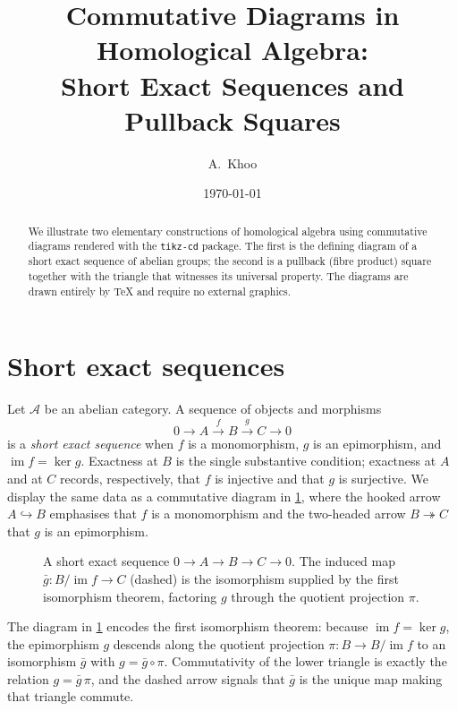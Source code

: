 \documentclass[11pt]{article}
\title{Commutative Diagrams in Homological Algebra:\\ Short Exact Sequences and Pullback Squares}
\author{A.\ Khoo}
\date{\today}
\begin{document}
\maketitle

\begin{abstract}
We illustrate two elementary constructions of homological algebra using
commutative diagrams rendered with the \texttt{tikz-cd} package. The first is the
defining diagram of a short exact sequence of abelian groups; the second is a
pullback (fibre product) square together with the triangle that witnesses its
universal property. The diagrams are drawn entirely by \TeX{} and require no
external graphics.
\end{abstract}

\section{Short exact sequences}

Let $\mathcal{A}$ be an abelian category. A sequence of objects and morphisms
\[
  0 \longrightarrow A \xrightarrow{\,f\,} B \xrightarrow{\,g\,} C \longrightarrow 0
\]
is a \emph{short exact sequence} when $f$ is a monomorphism, $g$ is an
epimorphism, and $\operatorname{im} f = \ker g$. Exactness at $B$ is the single
substantive condition; exactness at $A$ and at $C$ records, respectively, that
$f$ is injective and that $g$ is surjective. We display the same data as a
commutative diagram in \cref{fig:ses}, where the hooked arrow
$A \hookrightarrow B$ emphasises that $f$ is a monomorphism and the two-headed
arrow $B \twoheadrightarrow C$ that $g$ is an epimorphism.

\begin{figure}[ht]
  \centering
  \caption{A short exact sequence $0 \to A \to B \to C \to 0$. The induced map
  $\bar{g}\colon B/\operatorname{im} f \to C$ (dashed) is the isomorphism
  supplied by the first isomorphism theorem, factoring $g$ through the quotient
  projection $\pi$.}
  \label{fig:ses}
\end{figure}

The diagram in \cref{fig:ses} encodes the first isomorphism theorem: because
$\operatorname{im} f = \ker g$, the epimorphism $g$ descends along the quotient
projection $\pi\colon B \to B/\operatorname{im} f$ to an isomorphism
$\bar{g}$ with $g = \bar{g} \circ \pi$. Commutativity of the lower triangle is
exactly the relation $g = \bar{g}\,\pi$, and the dashed arrow signals that
$\bar{g}$ is the unique map making that triangle commute.
\end{document}
